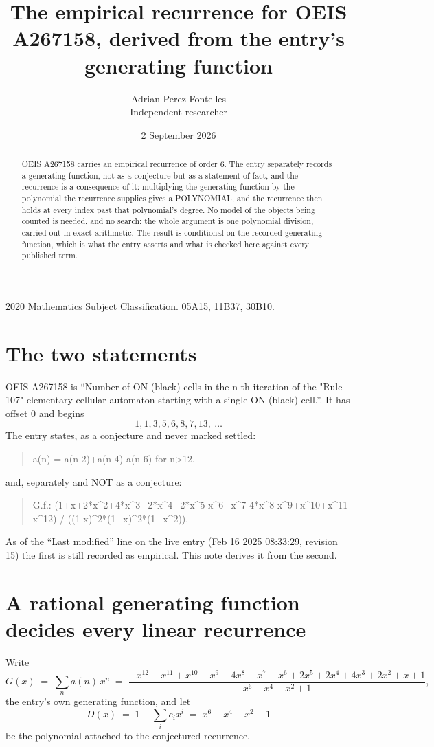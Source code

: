 \documentclass[11pt,a4paper]{article}
\title{The empirical recurrence for OEIS A267158, derived from the entry's generating function}
\author{Adrian Perez Fontelles\\ \small Independent researcher}
\date{2 September 2026}
\theoremstyle{plain}
\theoremstyle{definition}
\begin{document}
\maketitle

\begin{abstract}
OEIS A267158 carries an empirical recurrence of order $6$. The entry separately records a
generating function, not as a conjecture but as a statement of fact, and the recurrence is a
consequence of it: multiplying the generating function by the polynomial the recurrence
supplies gives a POLYNOMIAL, and the recurrence then holds at every index past that
polynomial's degree. No model of the objects being counted is needed, and no search: the
whole argument is one polynomial division, carried out in exact arithmetic. The result is
conditional on the recorded generating function, which is what the entry asserts and what is
checked here against every published term.
\end{abstract}

\noindent\small 2020 Mathematics Subject Classification. 05A15, 11B37, 30B10.\normalsize

\section{The two statements}

OEIS A267158 is ``Number of ON (black) cells in the n-th iteration of the "Rule 107" elementary cellular automaton starting with a single ON (black) cell.''. It has offset $0$ and begins
\[
1, 1, 3, 5, 6, 8, 7, 13,\ \dots
\]
The entry states, as a conjecture and never marked settled:
\begin{quote}
a(n) = a(n-2)+a(n-4)-a(n-6) for n>12.
\end{quote}
and, separately and NOT as a conjecture:
\begin{quote}
G.f.: (1+x+2*x\^{}2+4*x\^{}3+2*x\^{}4+2*x\^{}5-x\^{}6+x\^{}7-4*x\^{}8-x\^{}9+x\^{}10+x\^{}11-x\^{}12) / ((1-x)\^{}2*(1+x)\^{}2*(1+x\^{}2)).
\end{quote}
As of the ``Last modified'' line on the live entry (Feb 16 2025 08:33:29, revision 15) the first is still
recorded as empirical. This note derives it from the second.

\section{A rational generating function decides every linear recurrence}

Write
\[
G(x)\;=\;\sum_{n}a(n)\,x^{n}\;=\;\frac{- x^{12} + x^{11} + x^{10} - x^{9} - 4 x^{8} + x^{7} - x^{6} + 2 x^{5} + 2 x^{4} + 4 x^{3} + 2 x^{2} + x + 1}{x^{6} - x^{4} - x^{2} + 1},
\]
the entry's own generating function, and let
\[
D(x)\;=\;1-\sum_i c_i x^{i}\;=\;x^{6} - x^{4} - x^{2} + 1
\]
be the polynomial attached to the conjectured recurrence.
\end{document}
